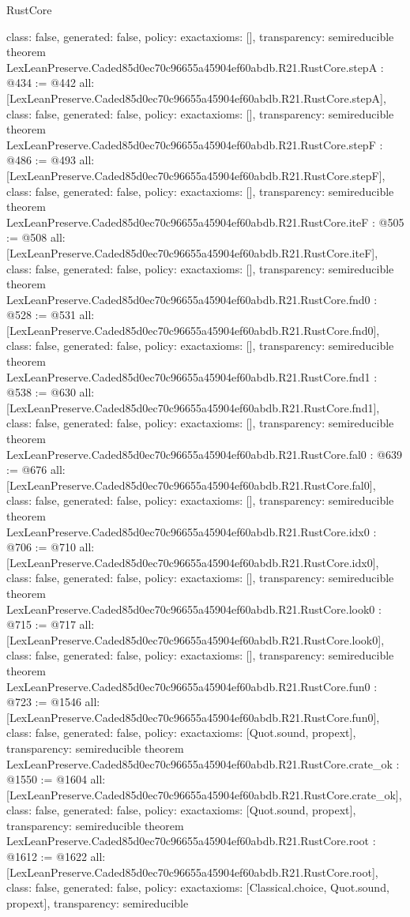 \begin{lexlean}{RustCore}
\begin{coremodule}
{  class: false,
  generated: false,
  policy: exact{axioms: []},
  transparency: semireducible
}
theorem LexLeanPreserve.Caded85d0ec70c96655a45904ef60abdb.R21.RustCore.stepA : @434 := @442 {
  all: [LexLeanPreserve.Caded85d0ec70c96655a45904ef60abdb.R21.RustCore.stepA],
  class: false,
  generated: false,
  policy: exact{axioms: []},
  transparency: semireducible
}
theorem LexLeanPreserve.Caded85d0ec70c96655a45904ef60abdb.R21.RustCore.stepF : @486 := @493 {
  all: [LexLeanPreserve.Caded85d0ec70c96655a45904ef60abdb.R21.RustCore.stepF],
  class: false,
  generated: false,
  policy: exact{axioms: []},
  transparency: semireducible
}
theorem LexLeanPreserve.Caded85d0ec70c96655a45904ef60abdb.R21.RustCore.iteF : @505 := @508 {
  all: [LexLeanPreserve.Caded85d0ec70c96655a45904ef60abdb.R21.RustCore.iteF],
  class: false,
  generated: false,
  policy: exact{axioms: []},
  transparency: semireducible
}
theorem LexLeanPreserve.Caded85d0ec70c96655a45904ef60abdb.R21.RustCore.fnd0 : @528 := @531 {
  all: [LexLeanPreserve.Caded85d0ec70c96655a45904ef60abdb.R21.RustCore.fnd0],
  class: false,
  generated: false,
  policy: exact{axioms: []},
  transparency: semireducible
}
theorem LexLeanPreserve.Caded85d0ec70c96655a45904ef60abdb.R21.RustCore.fnd1 : @538 := @630 {
  all: [LexLeanPreserve.Caded85d0ec70c96655a45904ef60abdb.R21.RustCore.fnd1],
  class: false,
  generated: false,
  policy: exact{axioms: []},
  transparency: semireducible
}
theorem LexLeanPreserve.Caded85d0ec70c96655a45904ef60abdb.R21.RustCore.fal0 : @639 := @676 {
  all: [LexLeanPreserve.Caded85d0ec70c96655a45904ef60abdb.R21.RustCore.fal0],
  class: false,
  generated: false,
  policy: exact{axioms: []},
  transparency: semireducible
}
theorem LexLeanPreserve.Caded85d0ec70c96655a45904ef60abdb.R21.RustCore.idx0 : @706 := @710 {
  all: [LexLeanPreserve.Caded85d0ec70c96655a45904ef60abdb.R21.RustCore.idx0],
  class: false,
  generated: false,
  policy: exact{axioms: []},
  transparency: semireducible
}
theorem LexLeanPreserve.Caded85d0ec70c96655a45904ef60abdb.R21.RustCore.look0 : @715 := @717 {
  all: [LexLeanPreserve.Caded85d0ec70c96655a45904ef60abdb.R21.RustCore.look0],
  class: false,
  generated: false,
  policy: exact{axioms: []},
  transparency: semireducible
}
theorem LexLeanPreserve.Caded85d0ec70c96655a45904ef60abdb.R21.RustCore.fun0 : @723 := @1546 {
  all: [LexLeanPreserve.Caded85d0ec70c96655a45904ef60abdb.R21.RustCore.fun0],
  class: false,
  generated: false,
  policy: exact{axioms: [Quot.sound, propext]},
  transparency: semireducible
}
theorem LexLeanPreserve.Caded85d0ec70c96655a45904ef60abdb.R21.RustCore.crate_ok : @1550 := @1604 {
  all: [LexLeanPreserve.Caded85d0ec70c96655a45904ef60abdb.R21.RustCore.crate_ok],
  class: false,
  generated: false,
  policy: exact{axioms: [Quot.sound, propext]},
  transparency: semireducible
}
theorem LexLeanPreserve.Caded85d0ec70c96655a45904ef60abdb.R21.RustCore.root : @1612 := @1622 {
  all: [LexLeanPreserve.Caded85d0ec70c96655a45904ef60abdb.R21.RustCore.root],
  class: false,
  generated: false,
  policy: exact{axioms: [Classical.choice, Quot.sound, propext]},
  transparency: semireducible
}


\end{coremodule}
\end{lexlean}
